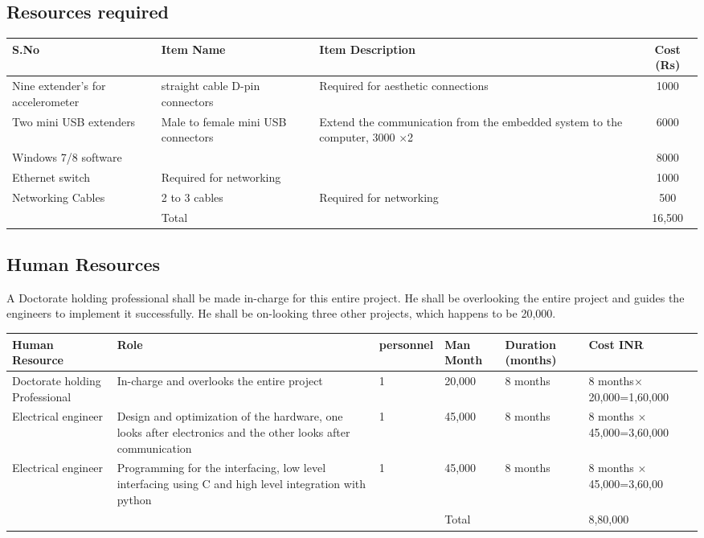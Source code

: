 \documentclass{FR16}
\begin{document}
\subsection{Resources required}
\begin{center}
\begin{tabular}{||p{3 cm} ||p{4 cm}|| p{6 cm}|| c|| }
\arrayrulecolor{Azzurro}
\hline
\hline
{\bfseries S.No} & {\bfseries Item Name}& {\bfseries Item Description} & {\bfseries Cost (Rs)} \\
\hline
\hline
Nine extender's for accelerometer &straight cable D-pin connectors & Required for aesthetic connections & 1000\\
\hline
\hline
Two mini USB extenders & Male to female mini USB connectors& Extend the communication from the embedded system to the computer, 3000 $\times$2 & 6000\\
\hline
\hline
Windows 7/8 software & &   & 8000\\
\hline
\hline
Ethernet switch & Required for networking & &1000\\
\hline
\hline
Networking Cables & 2 to 3 cables & Required for networking &500\\
\hline
\hline
& Total & & 16,500
 
 \end{tabular}
\end{center}



\newpage
\subsection{Human Resources}
A Doctorate holding professional shall be made in-charge for this entire project. He shall be overlooking the entire project and guides the engineers to implement it successfully. He shall be on-looking three other projects, which happens to be 20,000. 
\begin{center}
\begin{tabular}{||p{2 cm} ||p{3 cm}||p{1.5 cm}|| p{1.5 cm}|| p{2 cm}||p{3 cm}|| }
\arrayrulecolor{Azzurro}
\hline
\hline

{\bfseries Human Resource } & {\bfseries Role} & {\bfseries personnel}&{\bfseries Man Month}& {\bfseries Duration (months)} & {\bfseries Cost INR} \\
\hline
\hline
 Doctorate holding Professional  & In-charge and overlooks the entire project &1 & 20,000 & 8 months & 8 months$\times$ 20,000=1,60,000\\
\hline
\hline
Electrical engineer & Design and optimization of the hardware, one looks after electronics and the other looks after communication  &1 & 45,000 & 8 months & 8 months $\times$ 45,000=3,60,000\\
\hline
\hline
Electrical engineer &Programming for the interfacing, low level interfacing using C and high level integration with python  &1 & 45,000 & 8 months & 8 months $\times$ 45,000=3,60,00\\
\hline
\hline
& & & Total & & 8,80,000
\end{tabular}
\end{center}
\end{document}
